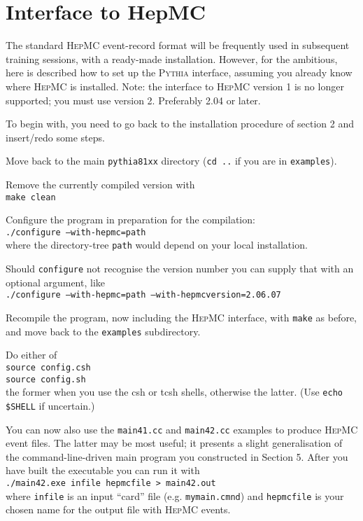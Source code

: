 \documentclass[12pt,a4paper]{article}
\newcounter{enumct}
\newenvironment{Enumerate}{\begin{list}{\arabic{enumct}.}%
{\usecounter{enumct}\setlength{\topsep}{0.4mm}%
\setlength{\partopsep}{0.4mm}\setlength{\itemsep}{0.4mm}%
\setlength{\parsep}{0.4mm}}}{\end{list}}
\begin{document}
\section{Interface to HepMC}

The standard \textsc{HepMC} event-record format will be frequently used 
in subsequent training sessions, with a ready-made installation. However, 
for the ambitious, here is described how to set up the \textsc{Pythia} 
interface, assuming you already know where \textsc{HepMC} is installed.
Note: the interface to \textsc{HepMC} version 1 is no longer supported; 
you must use version 2. Preferably 2.04 or later.

To begin with, you need to go back to the installation procedure 
of section 2 and insert/redo some steps.
\begin{Enumerate}
\item Move back to the main \texttt{pythia81xx} directory 
(\texttt{cd ..} if you are in \texttt{examples}).
\item Remove the currently compiled version with\\
\hspace*{10mm}\texttt{make clean}
\item Configure the program in preparation for the compilation:\\
\hspace*{10mm}\texttt{./configure --with-hepmc=path}\\
where the directory-tree \texttt{path} would depend on your local 
installation. 
\item Should \texttt{configure} not recognise the version number 
you can supply that with an optional argument, like\\
\hspace*{10mm}\texttt{./configure --with-hepmc=path --with-hepmcversion=2.06.07}
\item Recompile the program, now including the \textsc{HepMC} interface, 
with \texttt{make} as before, and move back to the \texttt{examples} 
subdirectory. 
\item Do either of\\
\hspace*{10mm}\texttt{source config.csh}\\
\hspace*{10mm}\texttt{source config.sh}\\
the former when you use the csh or tcsh shells, otherwise the latter.
(Use \texttt{echo \$SHELL} if uncertain.)  
\item You can now also use the \texttt{main41.cc} and \texttt{main42.cc}
examples to produce \textsc{HepMC} event files. The latter may be most useful;
it presents a slight generalisation of the command-line-driven main program
you constructed in Section 5. After you have built the executable you can 
run it with\\ 
\hspace*{10mm}\texttt{./main42.exe infile hepmcfile > main42.out}\\
where \texttt{infile} is an input ``card'' file (e.g. \texttt{mymain.cmnd})
and \texttt{hepmcfile} is your chosen name for the output file with 
\textsc{HepMC} events.
\end{Enumerate}
\end{document}
